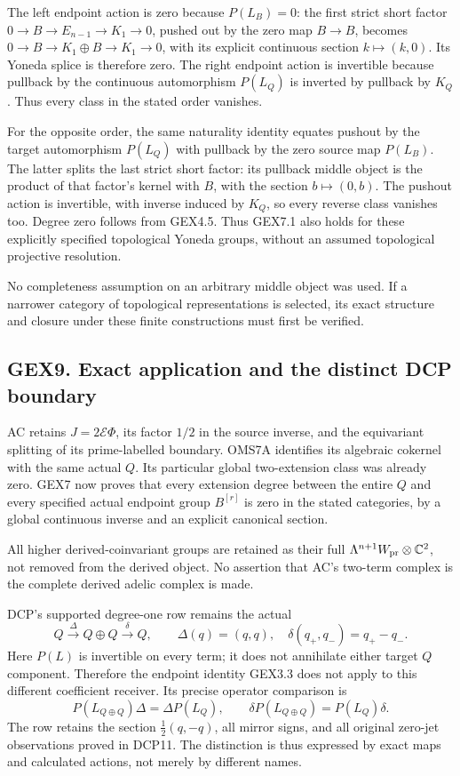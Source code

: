 The left endpoint action is zero because \(P(L_B)=0\): the first strict
short factor \(0\to B\to E_{n-1}\to K_1\to0\), pushed out by the zero
map \(B\to B\), becomes \(0\to B\to K_1\oplus B\to K_1\to0\), with its
explicit continuous section \(k\mapsto(k,0)\). Its Yoneda splice is
therefore zero. The right endpoint action is invertible because pullback
by the continuous automorphism \(P(L_Q)\) is inverted by pullback by
\(K_Q\). Thus every class in the stated order vanishes.

For the opposite order, the same naturality identity equates pushout by
the target automorphism \(P(L_Q)\) with pullback by the zero source map
\(P(L_B)\). The latter splits the last strict short factor: its pullback
middle object is the product of that factor's kernel with \(B\), with
the section \(b\mapsto(0,b)\). The pushout action is invertible, with
inverse induced by \(K_Q\), so every reverse class vanishes too. Degree
zero follows from GEX4.5. Thus GEX7.1 also holds for these explicitly
specified topological Yoneda groups, without an assumed topological
projective resolution.

No completeness assumption on an arbitrary middle object was used. If a
narrower category of topological representations is selected, its exact
structure and closure under these finite constructions must first be
verified.

\subsection{GEX9. Exact application and the distinct DCP
boundary}\label{gex9.-exact-application-and-the-distinct-dcp-boundary}

AC retains \(J=2\mathcal E\Phi\), its factor \(1/2\) in the source
inverse, and the equivariant splitting of its prime-labelled boundary.
OMS7A identifies its algebraic cokernel with the same actual \(Q\). Its
particular global two-extension class was already zero. GEX7 now proves
that every extension degree between the entire \(Q\) and every specified
actual endpoint group \(B^{[r]}\) is zero in the stated categories, by a
global continuous inverse and an explicit canonical section.

All higher derived-coinvariant groups are retained as their full
\(\Lambda^{n+1}W_{\rm pr}\otimes\mathbb C^2\), not removed from the
derived object. No assertion that AC's two-term complex is the complete
derived adelic complex is made.

DCP's supported degree-one row remains the actual \[
Q\xrightarrow{\Delta}Q\oplus Q\xrightarrow{\delta}Q,\qquad
\Delta(q)=(q,q),\quad \delta(q_+,q_-)=q_+-q_-.
\tag{GEX9.1}
\] Here \(P(L)\) is invertible on every term; it does not annihilate
either target \(Q\) component. Therefore the endpoint identity GEX3.3
does not apply to this different coefficient receiver. Its precise
operator comparison is \[
P(L_{Q\oplus Q})\Delta=\Delta P(L_Q),\qquad
\delta P(L_{Q\oplus Q})=P(L_Q)\delta .
\tag{GEX9.2}
\] The row retains the section \(\tfrac12(q,-q)\), all mirror signs, and
all original zero-jet observations proved in DCP11. The distinction is
thus expressed by exact maps and calculated actions, not merely by
different names.

